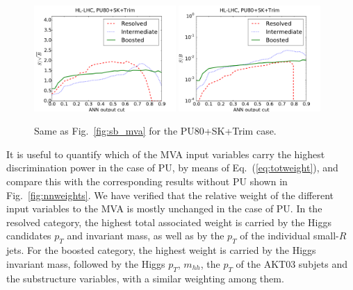 \begin{figure}[t]
\begin{center}
\includegraphics[width=0.48\textwidth]{plots/ssb_SKPU80.pdf}
\includegraphics[width=0.48\textwidth]{plots/sb_SKPU80.pdf}
\caption{\small 
  Same as Fig.~\ref{fig:sb_mva} for
  the PU80+SK+Trim case.
}
\label{fig:sb_mva_PU}
\end{center}
\end{figure}

It is useful to quantify which of the MVA input variables
carry the highest discrimination power
in the case of PU, by means of
Eq.~(\ref{eq:totweight}),
and compare this with the corresponding
results without PU shown in Fig.~\ref{fig:nnweights}.
%
We have verified that 
the relative weight of the different input variables to the MVA
is mostly unchanged in the case of PU.
%
In the resolved category, the highest total associated weight is carried
by the Higgs candidates $p_T$ and invariant mass, as well
as by the $p_T$ of the individual small-$R$ jets.
%
For the boosted category, the highest weight is carried by the
Higgs invariant mass, followed by
the Higgs $p_T$, $m_{hh}$, the $p_T$ of the AKT03 subjets and the
substructure variables, with a similar weighting among them.

